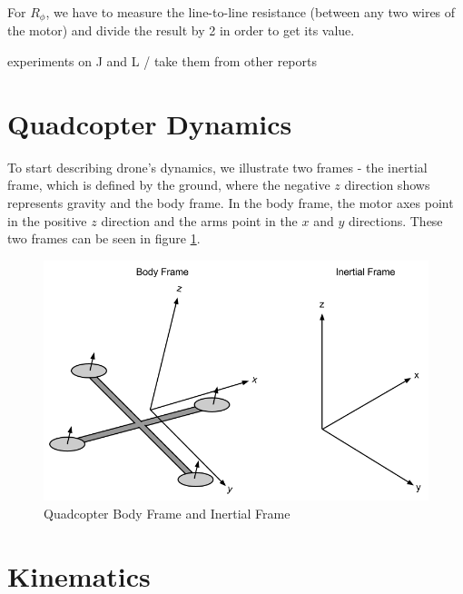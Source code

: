 For $R_{\phi}$, we have to measure the line-to-line resistance (between any two wires of the motor) and divide the result by 2 in order to get its value.

experiments on J and L / take them from other reports 

\clearpage

\section{Quadcopter Dynamics}

To start describing drone's dynamics, we illustrate two frames - the inertial frame, which is defined by the ground, where the negative $z$ direction shows represents gravity and the body frame. In the body frame, the motor axes point in the positive $z$ direction and the arms point in the $x$ and $y$ directions. These two frames can be seen in figure \ref{frames}.

\begin{figure}[H]
  \centering
    \includegraphics[width=1\textwidth]{images/frames.png}
	\caption{Quadcopter Body Frame and Inertial Frame}
	\label{frames}
\end{figure}

\section{Kinematics}

